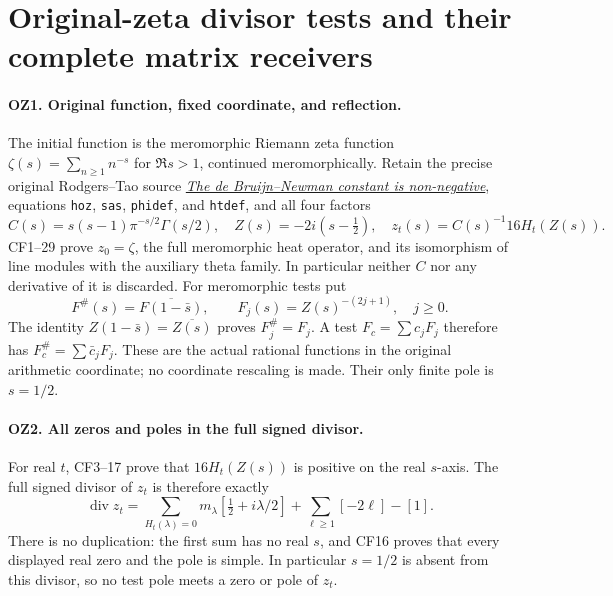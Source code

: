 \section{Original-zeta divisor tests and their complete matrix receivers}
\label{sec:original-zeta-divisor-matrix}

\paragraph{OZ1. Original function, fixed coordinate, and reflection.}
The initial function is the meromorphic Riemann zeta function
\(\zeta(s)=\sum_{n\ge1}n^{-s}\) for \(\Re s>1\), continued
meromorphically. Retain the precise original Rodgers--Tao source
\href{https://arxiv.org/abs/1801.05914v5}{\emph{The de Bruijn--Newman
constant is non-negative}}, equations \texttt{hoz}, \texttt{sas},
\texttt{phidef}, and \texttt{htdef}, and all four factors
\[
 C(s)=s(s-1)\pi^{-s/2}\Gamma(s/2),\quad
 Z(s)=-2i(s-\tfrac12),\quad
 z_t(s)=C(s)^{-1}16H_t(Z(s)).                         \tag{OZ1}
\]
CF1--29 prove \(z_0=\zeta\), the full meromorphic heat operator,
and its isomorphism of line modules with the auxiliary theta family.
In particular neither \(C\) nor any derivative of it is discarded.
For meromorphic tests put
\[
 F^\#(s)=\overline{F(1-\bar s)},\qquad
 F_j(s)=Z(s)^{-(2j+1)},\quad j\ge0.                 \tag{OZ2}
\]
The identity \(Z(1-\bar s)=\overline{Z(s)}\) proves
\(F_j^\#=F_j\). A test \(F_c=\sum c_jF_j\) therefore has
\(F_c^\#=\sum\bar c_jF_j\). These are the actual rational
functions in the original arithmetic coordinate; no coordinate
rescaling is made. Their only finite pole is \(s=1/2\).

\paragraph{OZ2. All zeros and poles in the full signed divisor.}
For real \(t\), CF3--17 prove that \(16H_t(Z(s))\) is positive
on the real \(s\)-axis. The full signed divisor of \(z_t\) is
therefore exactly
\[
 \operatorname{div}z_t
 =\sum_{H_t(\lambda)=0}m_\lambda
       [\tfrac12+i\lambda/2]
       +\sum_{\ell\ge1}[-2\ell]-[1].              \tag{OZ3}
\]
There is no duplication: the first sum has no real \(s\), and
CF16 proves that every displayed real zero and the pole is simple.
In particular \(s=1/2\) is absent from this divisor, so no test
pole meets a zero or pole of \(z_t\).

